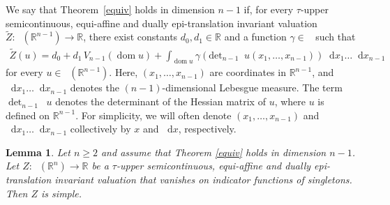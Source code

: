 \documentclass[11pt]{article}
\newtheorem{lema}[teo]{Lemma}
\theoremstyle{definition} %
\newcommand{\dif}{\mathop{}\!\mathrm{d}}
\DeclareMathOperator{\dom}{dom}
\DeclareMathOperator{\D}{D^2}
\DeclareMathOperator{\LP}{Conv_{lp}}
\DeclareMathOperator{\conc}{Conc([0,\infty))}
\begin{document}
We say that Theorem~\ref{equiv} holds in dimension $n-1$ if, for every $\tau$-upper semicontinuous, equi-affine and dually epi-translation invariant valuation 
$\tilde{Z}:\LP(\mathbb{R}^{n-1})\rightarrow\mathbb{R}$, there exist  constants $d_0,d_1\in\mathbb{R}$ and a function $\gamma\in\conc$  such that
\begin{align}\label{(n-1)-dimensional}
   \tilde{Z}(u)=d_0+d_1\, V_{n-1}(\dom u)+\int_{\dom u} \gamma(\mbox{det}_{n-1}\D u(x_1,\dots, x_{n-1}))\dif x_1\dots \dif x_{n-1} 
\end{align}
 for every $u\in \LP(\mathbb{R}^{n-1})$.  Here, $(x_1,\dots, x_{n-1})$ are coordinates in $\mathbb{R}^{n-1}$, and $\dif x_1\dots \dif x_{n-1}$ denotes the $(n-1)$-dimensional Lebesgue measure. The term $\det_{n-1}\D u$ denotes the determinant of the Hessian matrix of $u$, where $u$ is defined on $\mathbb{R}^{n-1}$. For simplicity, we will often denote $(x_1,\dots, x_{n-1})$ and $\dif x_1\dots \dif x_{n-1}$ collectively by $x$ and $\dif x$, respectively.





\begin{lema}\label{simple}
Let $n\ge 2$ and assume that Theorem \ref{equiv} holds in dimension $n-1$. Let
$Z:\LP(\mathbb{R}^n)\rightarrow\mathbb{R}$
be a $\tau$-upper semicontinuous, equi-affine and dually epi-translation invariant valuation that vanishes on indicator functions of singletons. Then $Z$ is simple.
\end{lema}
\end{document}
